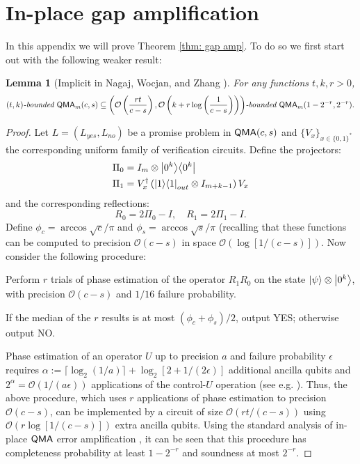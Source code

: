 \documentclass[11pt]{article}
\newtheorem{lemma}[theorem]{Lemma}
\theoremstyle{definition}
\theoremstyle{remark}
\newcommand\QMA{{\sf{QMA}}}
\newcommand\bddQMA[5]{{\left(#1,#2\right)}\textit{-bounded }\QMA_{#3}(#4,#5)}
\newcommand\bigoh{\mathcal{O}}
\begin{document}
\section{In-place gap amplification} \label{app: gap amplification}
In this appendix we will prove Theorem \ref{thm: gap amp}. To do so we first start out with the following weaker result:
\begin{lemma}[Implicit in Nagaj, Wocjan, and Zhang \cite{nwz11}] \label{lem: gap amp 1}
For any functions $t,k,r>0$, 
\[
\bddQMA{t}{k}{m}{c}{s}\subseteq\bddQMA{\mathcal{O}\left(\frac{rt}{c-s}\right)}{\mathcal{O}\left(k+r\log\left(\frac{1}{c-s}\right)\right)}{m}{1-2^{-r}}{2^{-r}}.
\]
\end{lemma}
\begin{proof}
	Let $L=(L_{yes}, L_{no})$ be a promise problem in $\QMA(c,s)$ and $\{V_x\}_{x\in\{0,1\}^*}$ the corresponding uniform family of verification circuits.
Define the projectors:
\begin{align}
\Pi_0 &= I_m \otimes {\left\vert{0^k}\right\rangle}{\left\langle{0^k}\right\vert} \\
\Pi_1 &= V^\dagger_x \left({\left\vert{1}\right\rangle}{\left\langle{1}\right\vert}_{out} \otimes I_{m+k-1}\right) V_x
\end{align}
and the corresponding reflections:
\begin{equation}
R_0 = 2\Pi_0 - I, \quad R_1 = 2\Pi_1 - I.
\end{equation}
Define $\phi_c = \arccos\sqrt{c}/\pi$ and $\phi_s = \arccos\sqrt{s}/\pi$ (recalling that these functions can be computed to precision $\bigoh (c-s)$ in space $\bigoh (\log[1/(c-s)])$. 
Now consider the following procedure:
\begin{compactenum}
\item Perform $r$ trials of phase estimation of the operator $R_1R_0$ on the state ${\left\vert{\psi}\right\rangle}\otimes {\left\vert{0^k}\right\rangle}$, with  precision $\mathcal{O}(c-s)$ and $1/16$ failure probability. 
\item If the median of the $r$ results is at most $(\phi_{c}+\phi_{s})/2$, output YES; otherwise output NO.
\end{compactenum}
Phase estimation of an operator $U$ up to precision $a$ and failure probability $\epsilon$ requires $\alpha := \lceil\log_2(1/a)\rceil + \log_2[2+1/(2\epsilon)]$ additional ancilla qubits and $2^\alpha = \mathcal{O}(1/(a\epsilon))$ applications of the control-$U$ operation (see e.g. \cite{nc00}).  Thus, the above procedure, which uses $r$ applications of phase estimation to precision $\mathcal{O}(c-s)$, can be implemented by a circuit of size $\mathcal{O}(rt/(c-s))$ using $\mathcal{O}(r\log[1/(c-s)])$ extra ancilla qubits. Using the standard analysis of in-place $\QMA$ error amplification \cite{mw05,nwz11}, it can be seen that this procedure has completeness probability at least $1-2^{-r}$ and soundness at most $2^{-r}$.
\end{proof}
\end{document}
